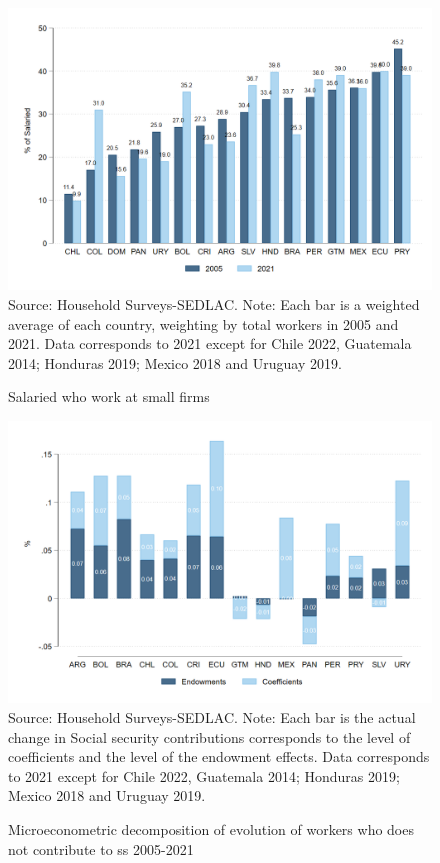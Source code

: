 \documentclass[english]{article}
\begin{document}
\begin{itemize}
\begin{figure}[!htb]
    \justifying
     \caption{Salaried who work at small firms}     
     \includegraphics[scale=.3]{latex/figures/Snapshot/snapshot_dependents_small.png}
    \label{fig:SalariedSmall}
    \footnotesize{Source: Household Surveys-SEDLAC.}
    \footnotesize{Note: Each bar is a weighted average of each country, weighting by total workers in 2005 and 2021.  Data corresponds to 2021 except for Chile 2022, Guatemala 2014; Honduras 2019; Mexico 2018 and Uruguay 2019.}
\end{figure}


      

\begin{figure}[!htb]
        \justifying
        \caption{Microeconometric decomposition of evolution of workers who does not contribute to ss 2005-2021}     
        \includegraphics[scale=.3]{latex/figures/Snapshot/Oaxaca decomposition level.png}
        \label{fig:Oaxaca_level}
        \footnotesize{Source: Household Surveys-SEDLAC.}
        \footnotesize{Note: Each bar is the actual change in Social security contributions corresponds to the level of coefficients and the level of the endowment effects.  Data corresponds to 2021 except for Chile 2022, Guatemala 2014; Honduras 2019; Mexico 2018 and Uruguay 2019.}
        \end{figure}
\end{itemize}
\end{document}
